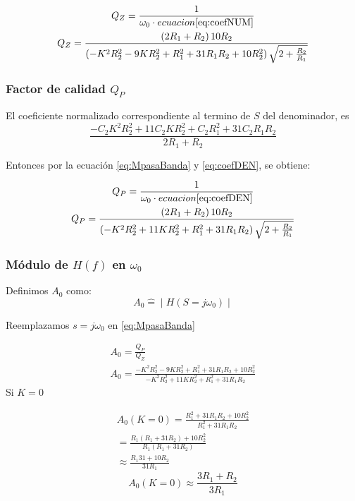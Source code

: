 \documentclass[../../tc_tp3_main.tex]{subfiles}
\begin{document}
\begin{gather}
Q_Z=\frac{1}{\omega_0 \cdot ecuacion\ref{eq:coefNUM}}\\
Q_Z=\frac{\left( 2R_1 +R_2 \right) 10 R_2 }{\left( - K ^2 R_2^2 - 9   K R_2 ^2 +  R_1^2 +31  R_1 R_2+10  R_2^2 \right)\sqrt{2+\frac{R_2}{R_1}} }
\end{gather}







\subsubsection{Factor de calidad $Q_P$}
El coeficiente normalizado correspondiente al termino de $S$ del denominador, es
\begin{equation}
\frac{-C_2 K ^2 R_2^2 + 11  C_2 K R_2 ^2 + C_2 R_1^2 +31 C_2 R_1 R_2}{2R_1 +R_2} \label{eq:coefDEN}
\end{equation}


Entonces por la ecuación \ref{eq:MpasaBanda} y \ref{eq:coefDEN}, se obtiene:

\begin{gather}
Q_P=\frac{1}{\omega_0 \cdot ecuacion\ref{eq:coefDEN}}\\
Q_P=\frac{\left( 2R_1 +R_2 \right) 10 R_2 }{\left( - K ^2 R_2^2 + 11   K R_2 ^2 +  R_1^2 +31  R_1 R_2 \right)\sqrt{2+\frac{R_2}{R_1}} }
\end{gather}


\subsubsection{M\'odulo de $H(f)$ en $\omega_0$}
Definimos $A_0$ como:
\begin{equation}
A_0	\widehat{=} \mid H(S=j\omega_0) \mid
\end{equation}

Reemplazamos $s=j\omega_0$ en \ref{eq:MpasaBanda}

\begin{gather}
A_0 =\frac{Q_P}{Q_Z}\\
A_0=\frac{- K ^2 R_2^2 - 9   K R_2 ^2 +  R_1^2 +31  R_1 R_2+10  R_2^2}{ - K ^2 R_2^2 + 11   K R_2 ^2 +  R_1^2 +31  R_1 R_2 }
\end{gather}
Si $K=0$

\begin{equation}
\begin{split}
A_0(K=0) =\frac{R_1^2 +31  R_1 R_2+10  R_2^2}{  R_1^2 +31  R_1 R_2}\\
= \frac{R_1(R_1+31R_2)+10R_2^2}{R_1(R_1+31R_2)}\\
\approx \frac{R_1 31 + 10 R_2}{31 R_1}
\end{split}
\end{equation}
\begin{equation}
A_0(K=0) \approx \frac {3R_1 + R_2}{3R_1} \label{eq:A00}
\end{equation}
\end{document}
